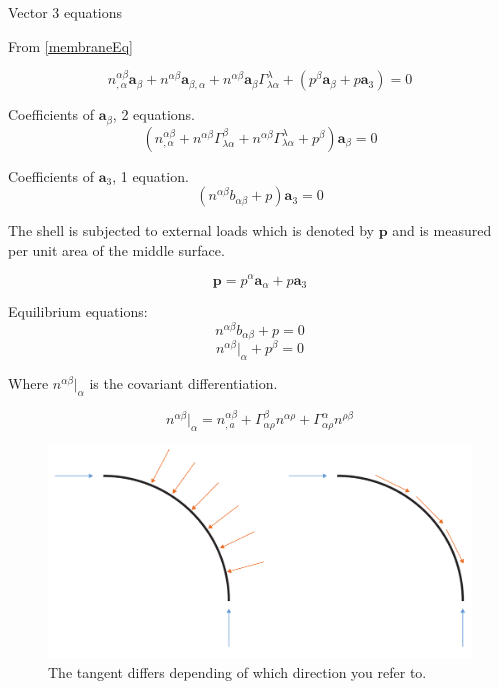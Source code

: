 Vector 3 equations

From \ref{membraneEq}

\begin{equation}
n^{\alpha \beta}_{,\alpha} \textbf{a}_\beta + n^{\alpha \beta}\textbf{a}_{\beta,\alpha} + n^{\alpha \beta}\textbf{a}_\beta \Gamma^\lambda_{\lambda \alpha} + (p^\beta \textbf{a}_\beta + p\textbf{a}_3) = 0
\end{equation}

Coefficients of $\textbf{a}_\beta$,  2 equations.
\begin{equation}
(n^{\alpha \beta}_{,\alpha} + n^{\alpha \beta}\Gamma^\beta_{\lambda \alpha} + n^{\alpha \beta}\Gamma^\lambda_{\lambda \alpha} + p^\beta) \textbf{a}_\beta = 0 
\end{equation}

Coefficients of $\textbf{a}_3$,  1 equation.
\begin{equation}
(n^{\alpha \beta} b_{\alpha \beta} + p)\textbf{a}_3 = 0
\end{equation}

The shell is subjected to external loads which is denoted by $\textbf{p}$ and is measured per unit area of the middle surface.

\begin{equation}
\textbf{p} = p^{\alpha}\textbf{a}_\alpha +p\textbf{a}_3
\end{equation}


Equilibrium equations:
\begin{equation}
n^{\alpha \beta}b_{\alpha \beta} + p = 0
\end{equation}
\begin{equation}
n^{\alpha \beta}|_\alpha + p^\beta = 0
\end{equation}

Where $n^{\alpha \beta}|_\alpha$ is the covariant differentiation. 

\begin{equation}
n^{\alpha \beta}|_\alpha = n^{\alpha \beta}_{,a} + \Gamma^\beta_{\alpha \rho} n^{\alpha \rho} + \Gamma^\alpha_{\alpha \rho} n^{\rho \beta}
\end{equation}


\begin{figure}[H]
\centering
\includegraphics[width=0.9\linewidth ]{figure/Theory/equlibriumMem.pdf}
\caption{The tangent differs depending of which direction you refer to. }
\end{figure}

